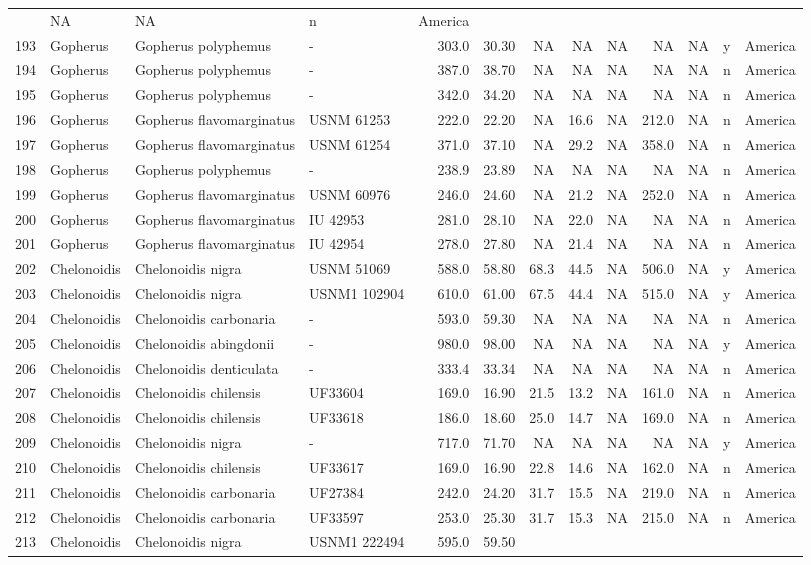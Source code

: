\begin{landscape}
{\begin{longtable}[]{@{}llllrrrrrrlll@{}}
	& NA & NA & n & America\tabularnewline
	193 & Gopherus & Gopherus polyphemus & - & 303.0 & 30.30 & NA & NA & NA
	& NA & NA & y & America\tabularnewline
	194 & Gopherus & Gopherus polyphemus & - & 387.0 & 38.70 & NA & NA & NA
	& NA & NA & n & America\tabularnewline
	195 & Gopherus & Gopherus polyphemus & - & 342.0 & 34.20 & NA & NA & NA
	& NA & NA & n & America\tabularnewline
	196 & Gopherus & Gopherus flavomarginatus & USNM 61253 & 222.0 & 22.20 &
	NA & 16.6 & NA & 212.0 & NA & n & America\tabularnewline
	197 & Gopherus & Gopherus flavomarginatus & USNM 61254 & 371.0 & 37.10 &
	NA & 29.2 & NA & 358.0 & NA & n & America\tabularnewline
	198 & Gopherus & Gopherus polyphemus & - & 238.9 & 23.89 & NA & NA & NA
	& NA & NA & n & America\tabularnewline
	199 & Gopherus & Gopherus flavomarginatus & USNM 60976 & 246.0 & 24.60 &
	NA & 21.2 & NA & 252.0 & NA & n & America\tabularnewline
	200 & Gopherus & Gopherus flavomarginatus & IU 42953 & 281.0 & 28.10 &
	NA & 22.0 & NA & NA & NA & n & America\tabularnewline
	201 & Gopherus & Gopherus flavomarginatus & IU 42954 & 278.0 & 27.80 &
	NA & 21.4 & NA & NA & NA & n & America\tabularnewline
	202 & Chelonoidis & Chelonoidis nigra & USNM 51069 & 588.0 & 58.80 &
	68.3 & 44.5 & NA & 506.0 & NA & y & America\tabularnewline
	203 & Chelonoidis & Chelonoidis nigra & USNM1 102904 & 610.0 & 61.00 &
	67.5 & 44.4 & NA & 515.0 & NA & y & America\tabularnewline
	204 & Chelonoidis & Chelonoidis carbonaria & - & 593.0 & 59.30 & NA & NA
	& NA & NA & NA & n & America\tabularnewline
	205 & Chelonoidis & Chelonoidis abingdonii & - & 980.0 & 98.00 & NA & NA
	& NA & NA & NA & y & America\tabularnewline
	206 & Chelonoidis & Chelonoidis denticulata & - & 333.4 & 33.34 & NA &
	NA & NA & NA & NA & n & America\tabularnewline
	207 & Chelonoidis & Chelonoidis chilensis & UF33604 & 169.0 & 16.90 &
	21.5 & 13.2 & NA & 161.0 & NA & n & America\tabularnewline
	208 & Chelonoidis & Chelonoidis chilensis & UF33618 & 186.0 & 18.60 &
	25.0 & 14.7 & NA & 169.0 & NA & n & America\tabularnewline
	209 & Chelonoidis & Chelonoidis nigra & - & 717.0 & 71.70 & NA & NA & NA
	& NA & NA & y & America\tabularnewline
	210 & Chelonoidis & Chelonoidis chilensis & UF33617 & 169.0 & 16.90 &
	22.8 & 14.6 & NA & 162.0 & NA & n & America\tabularnewline
	211 & Chelonoidis & Chelonoidis carbonaria & UF27384 & 242.0 & 24.20 &
	31.7 & 15.5 & NA & 219.0 & NA & n & America\tabularnewline
	212 & Chelonoidis & Chelonoidis carbonaria & UF33597 & 253.0 & 25.30 &
	31.7 & 15.3 & NA & 215.0 & NA & n & America\tabularnewline
	213 & Chelonoidis & Chelonoidis nigra & USNM1 222494 & 595.0 & 59.50 &

\end{longtable}}
\end{landscape}
